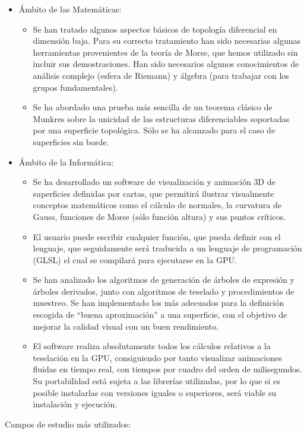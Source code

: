 \begin{itemize}
	\item Ámbito de las Matemáticas:
	\begin{itemize}
		\item Se han tratado algunos aspectos básicos de topología diferencial en dimensión baja. Para su correcto tratamiento han sido necesarias algunas herramientas provenientes de la teoría de Morse, que hemos utilizado sin incluir sus demostraciones. Han sido necesarios algunos conocimientos de análisis complejo (esfera de Riemann) y álgebra (para trabajar con los grupos fundamentales).
		\item Se ha abordado una prueba más sencilla de un teorema clásico de Munkres sobre la unicidad de las estructuras diferenciables soportadas por una superficie topológica. Sólo se ha alcanzado para el caso de superficies sin borde.
	\end{itemize}
	\item Ámbito de la Informática:
	\begin{itemize}
		\item Se ha desarrollado un software de visualización y animación $3$D de superficies definidas por cartas, que permitirá ilustrar visualmente conceptos matemáticos como el cálculo de normales, la curvatura de Gauss, funciones de Morse (sólo función altura) y sus puntos críticos.
		\item El usuario puede escribir cualquier función, que pueda definir con el lenguaje, que seguidamente será traducida a un lenguaje de programación (GLSL) el cual se compilará para ejecutarse en la GPU.
		\item Se han analizado los algoritmos de generación de árboles de expresión y árboles derivados, junto con algoritmos de teselado y procedimientos de muestreo. Se han implementado los más adecuados para la definición escogida de ``buena aproximación'' a una superficie, con el objetivo de mejorar la calidad visual con un buen rendimiento.
		\item El software realiza absolutamente todos los cálculos relativos a la teselación en la GPU, consiguiendo por tanto visualizar animaciones fluidas en tiempo real, con tiempos por cuadro del orden de milisegundos. Su portabilidad está sujeta a las librerías utilizadas, por lo que si es posible instalarlas con versiones iguales o superiores, será viable su instalación y ejecución.
	\end{itemize}
\end{itemize}
Campos de estudio más utilizados:
